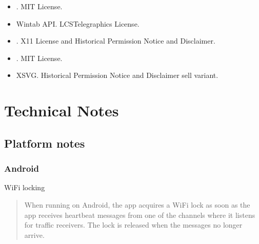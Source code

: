 \documentclass[letterpaper,10pt,english]{sphinxmanual}
\begin{document}
\begin{itemize}
\item {} 
\sphinxAtStartPar
{}%
\begin{footnote}[83]\sphinxAtStartFootnote
{}
%
\end{footnote}. MIT License.

\item {} 
\sphinxAtStartPar
Wintab API. LCS\sphinxhyphen{}Telegraphics License.

\item {} 
\sphinxAtStartPar
{}%
\begin{footnote}[84]\sphinxAtStartFootnote
{}
%
\end{footnote}. X11 License and Historical Permission Notice and Disclaimer.

\item {} 
\sphinxAtStartPar
{}%
\begin{footnote}[85]\sphinxAtStartFootnote
{}
%
\end{footnote}. MIT License.

\item {} 
\sphinxAtStartPar
XSVG. Historical Permission Notice and Disclaimer \sphinxhyphen{} sell variant.

\end{itemize}


\chapter{Technical Notes}
\label{\detokenize{04-appendix/technical:technical-notes}}\label{\detokenize{04-appendix/technical::doc}}

\section{Platform notes}
\label{\detokenize{04-appendix/technical:platform-notes}}

\subsection{Android}
\label{\detokenize{04-appendix/technical:android}}
\sphinxAtStartPar
Wi\sphinxhyphen{}Fi locking
\begin{quote}

\sphinxAtStartPar
When running on Android, the app acquires a Wi\sphinxhyphen{}Fi lock as soon as the app
receives heartbeat messages from one of the channels where it listens for
traffic receivers.  The lock is released when the messages no longer arrive.
\end{quote}
\end{document}
